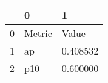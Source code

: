 \begin{tabular}{lll}
\toprule
 & 0 & 1 \\
\midrule
0 & Metric & Value \\
1 & ap & 0.408532 \\
2 & p10 & 0.600000 \\
\bottomrule
\end{tabular}
